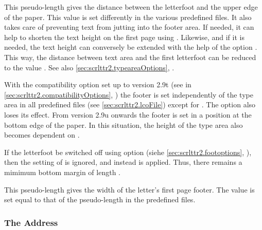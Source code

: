 \begin{Declaration}
\end{Declaration}
%
%
This pseudo-length gives the distance between the letterfoot and the
upper edge of the paper. This value is set differently in the various
predefined  files. It also takes care of preventing text
from jutting into the footer area. If needed, it can help to shorten
the text height on the first page using .
Likewise, and if it is needed, the text height can conversely be
extended with the help of the option . This
way, the distance between text area and the first letterfoot can be
reduced to the value . See also
\autoref{sec:scrlttr2.typeareaOptions},
.

With the compatibility option set up
to version 2.9t (see  in
\autoref{sec:scrlttr2.compatibilityOptions},
) the footer is set
independently of the type area in all predefined  files (see
\autoref{sec:scrlttr2.lcoFile}) except for . The
option  also loses its effect. From version
2.9u onwards the footer is set in a position at the bottom edge of the
paper. In this situation, the height of the type area also becomes
dependent on .

If the letterfoot be switched off using option
(siehe \autoref{sec:scrlttr2.footoptions},
), then the setting of
 is ignored, and instead
 is applied.  Thus, there
remains a mimimum bottom margin of length
.
%
%


\begin{Declaration}
\end{Declaration}
%
This pseudo-length gives the width of the letter's first page
footer. The value is set equal to that of the pseudo-length
 in the predefined  files.
%
%

%
%

\subsubsection{The Address}
\label{sec:scrlttr2-experts.addressee}
%

